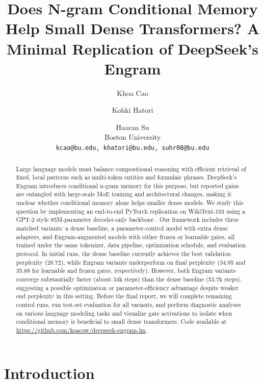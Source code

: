 \documentclass[11pt]{article}
\title{Does N-gram Conditional Memory Help Small Dense Transformers?
A Minimal Replication of DeepSeek's Engram}
\author{
	Khoa Cao \and Kohki Hatori \and Haoran Su \\
    Boston University \\
	\texttt{kcao@bu.edu, khatori@bu.edu, suhr08@bu.edu}
}
\begin{document}
\maketitle


\begin{abstract}
Large language models must balance compositional reasoning with efficient retrieval of fixed, local patterns such as multi-token entities and formulaic phrases. DeepSeek's Engram introduces conditional n-gram memory for this purpose, but reported gains are entangled with large-scale MoE training and architectural changes, making it unclear whether conditional memory alone helps smaller dense models. 
We study this question by implementing an end-to-end PyTorch replication on WikiText-103 using a GPT-2 style 85M-parameter decoder-only backbone \cite{radford2019language}. Our framework includes three matched variants: a dense baseline, a parameter-control model with extra dense adapters, and Engram-augmented models with either frozen or learnable gates, all trained under the same tokenizer, data pipeline, optimization schedule, and evaluation protocol. 
In initial runs, the dense baseline currently achieves the best validation perplexity (28.72), while Engram variants underperform on final perplexity (34.95 and 35.88 for learnable and frozen gates, respectively). However, both Engram variants converge substantially faster (about 34k steps) than the dense baseline (53.7k steps), suggesting a possible optimization or parameter-efficiency advantage despite weaker end perplexity in this setting. 
Before the final report, we will complete remaining control runs, run test-set evaluation for all variants, and perform diagnostic analyses on various language modeling tasks and visualize gate activations to isolate when conditional memory is beneficial to small dense transformers. Code available at \url{https://github.com/koacow/deepseek-engram-lm}.
\end{abstract}

\section{Introduction}
\end{document}
